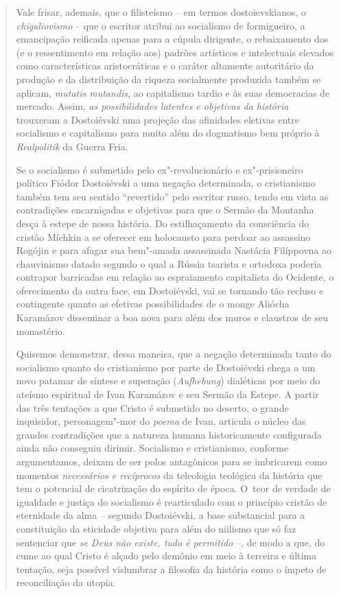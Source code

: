 {\begin{quote}
Vale frisar, ademais, que o filisteísmo -- em termos dostoievskianos, o
\emph{chigaliovismo} -- que o escritor atribui ao socialismo de
formigueiro, a emancipação reificada apenas para a cúpula dirigente, o
rebaixamento dos (e o ressentimento em relação aos) padrões artísticos e
intelectuais elevados como características aristocráticas e o caráter
altamente autoritário da produção e da distribuição da riqueza
socialmente produzida também se aplicam, \emph{mutatis mutandis}, ao
capitalismo tardio e às suas democracias de mercado. Assim, \emph{as
possibilidades latentes e objetivas da história} trouxeram a Dostoiévski
uma projeção das afinidades eletivas entre socialismo e capitalismo para
muito além do dogmatismo bem próprio à \emph{Realpolitik} da Guerra
Fria.

Se o socialismo é submetido pelo ex"-revolucionário e ex"-prisioneiro
político Fiódor Dostoiévski a uma negação determinada, o cristianismo
também tem seu sentido ``revertido'' pelo escritor russo, tendo em vista
as contradições encarniçadas e objetivas para que o Sermão da Montanha
desça à estepe de nossa história. Do estilhaçamento da consciência do
cristão Míchkin a se oferecer em holocausto para perdoar ao assassino
Rogójin e para afagar sua bem"-amada assassinada Nastácia Filíppovna ao
chauvinismo datado segundo o qual a Rússia tsarista e ortodoxa poderia
contrapor barricadas em relação ao espraiamento capitalista do Ocidente,
o oferecimento da outra face, em Dostoiévski, vai se tornando tão
recluso e contingente quanto as efetivas possibilidades de o monge
Aliócha Karamázov disseminar a boa nova para além dos muros e claustros
de seu monastério.

Quisemos demonstrar, dessa maneira, que a negação determinada tanto do
socialismo quanto do cristianismo por parte de Dostoiévski chega a um
novo patamar de síntese e superação (\emph{Aufhebung}) dialéticas por
meio do ateísmo espiritual de Ivan Karamázov e seu Sermão da Estepe. A
partir das três tentações a que Cristo é submetido no deserto, o grande
inquisidor, personagem"-mor do \emph{poema} de Ivan, articula o núcleo
das grandes contradições que a natureza humana historicamente
configurada ainda não conseguiu dirimir. Socialismo e cristianismo,
conforme argumentamos, deixam de ser polos antagônicos para se
imbricarem como momentos \emph{necessários e recíprocos} da teleologia
teológica da história que tem o potencial de cicatrização do espírito de
época. O~teor de verdade de igualdade e justiça do socialismo é
rearticulado com o princípio cristão de eternidade da alma -- segundo
Dostoiévski, a base substancial para a constituição da eticidade
objetiva para além do niilismo que só faz sentenciar que \emph{se Deus
não existe, tudo é permitido} --, de modo a que, do cume ao qual Cristo
é alçado pelo demônio em meio à terceira e última tentação, seja
possível vislumbrar a filosofia da história como o ímpeto de
reconciliação da utopia.


\end{quote}}
